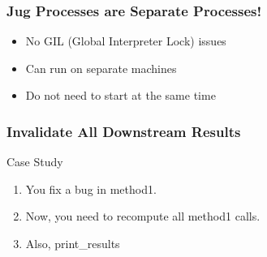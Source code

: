 \documentclass{beamer}
\begin{document}
\begin{frame}[fragile]
\frametitle{Jug Processes are Separate Processes!}
\begin{itemize}
\item \alert{No GIL (Global Interpreter Lock)} issues
\item Can run on \alert{separate machines}
\item Do not need to start at the same time
\end{itemize}
\end{frame}


\begin{frame}[fragile]
\frametitle{Invalidate All Downstream Results}
\begin{block}{Case Study}
\begin{enumerate}
\item You fix a bug in \alert{method1}.
\item Now, you need to recompute all \alert{method1} calls.
\item Also, \alert{print\_results}
\end{enumerate}
\end{block}
\end{frame}
\end{document}

